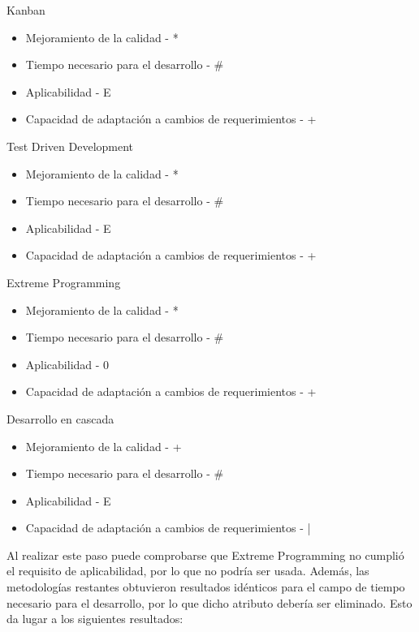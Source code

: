 \documentclass[twoside]{article}
\begin{document}
Kanban
\begin{itemize}
    \item Mejoramiento de la calidad - *
    \item Tiempo necesario para el desarrollo - \#
    \item Aplicabilidad - E
    \item Capacidad de adaptación a cambios de requerimientos - +
\end{itemize}
Test Driven Development
\begin{itemize}
    \item Mejoramiento de la calidad - *
    \item Tiempo necesario para el desarrollo - \#
    \item Aplicabilidad - E
    \item Capacidad de adaptación a cambios de requerimientos - +
\end{itemize}
Extreme Programming
\begin{itemize}
    \item Mejoramiento de la calidad - *
    \item Tiempo necesario para el desarrollo - \#
    \item Aplicabilidad - 0
    \item Capacidad de adaptación a cambios de requerimientos - +
\end{itemize}
Desarrollo en cascada
\begin{itemize}
    \item Mejoramiento de la calidad - +
    \item Tiempo necesario para el desarrollo - \#
    \item Aplicabilidad - E
    \item Capacidad de adaptación a cambios de requerimientos - |
\end{itemize}
Al realizar este paso puede comprobarse que Extreme Programming no cumplió el requisito de aplicabilidad, por lo que no podría ser usada. Además, las metodologías restantes obtuvieron resultados idénticos para el campo de tiempo necesario para el desarrollo, por lo que dicho atributo debería ser eliminado. Esto da lugar a los siguientes resultados:
\end{document}

